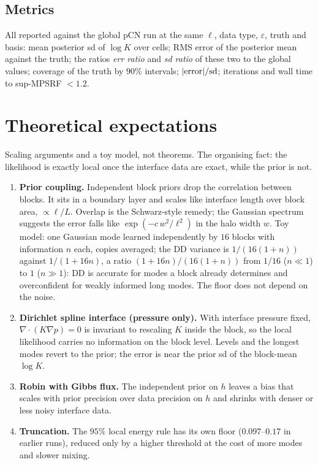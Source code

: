 \documentclass[11pt]{article}
\begin{document}
\subsection{Metrics}
All reported against the global pCN run at the same $\ell$, data type, $\varepsilon$, truth and basis: mean posterior sd of $\log K$ over cells; RMS error of the posterior mean against the truth; the ratios \emph{err ratio} and \emph{sd ratio} of these two to the global values; coverage of the truth by $90\%$ intervals; $|{\rm error}|/{\rm sd}$; iterations and wall time to sup-MPSRF $<1.2$.

\section{Theoretical expectations}\label{sec:theory}
Scaling arguments and a toy model, not theorems. The organising fact: the likelihood is exactly local once the interface data are exact, while the prior is not.
\begin{enumerate}
\item \textbf{Prior coupling.} Independent block priors drop the correlation between blocks. It sits in a boundary layer and scales like interface length over block area, $\propto\ell/L$. Overlap is the Schwarz-style remedy; the Gaussian spectrum suggests the error falls like $\exp(-c\,w^2/\ell^2)$ in the halo width $w$. Toy model: one Gaussian mode learned independently by $16$ blocks with information $n$ each, copies averaged; the DD variance is $1/(16(1+n))$ against $1/(1+16n)$, a ratio $(1+16n)/(16(1+n))$ from $1/16$ ($n\ll1$) to $1$ ($n\gg1$): DD is accurate for modes a block already determines and overconfident for weakly informed long modes. The floor does not depend on the noise.
\item \textbf{Dirichlet spline interface (pressure only).} With interface pressure fixed, $\nabla\!\cdot(K\nabla p)=0$ is invariant to rescaling $K$ inside the block, so the local likelihood carries no information on the block level. Levels and the longest modes revert to the prior; the error is near the prior sd of the block-mean $\log K$.
\item \textbf{Robin with Gibbs flux.} The independent prior on $h$ leaves a bias that scales with prior precision over data precision on $h$ and shrinks with denser or less noisy interface data.
\item \textbf{Truncation.} The $95\%$ local energy rule has its own floor ($0.097$--$0.17$ in earlier runs), reduced only by a higher threshold at the cost of more modes and slower mixing.
\end{enumerate}
\end{document}
